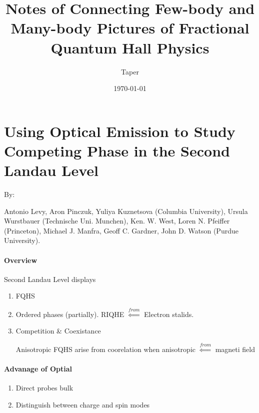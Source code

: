 \documentclass{article}
\title{Notes of Connecting Few-body and Many-body Pictures of Fractional Quantum Hall Physics}
\date{\today}
\author{Taper}
\numberwithin{equation}{subsection} %
\theoremstyle{definition}
\begin{document}
\maketitle
{}
\tableofcontents
\section{Using Optical Emission to Study Competing Phase in the Second
Landau Level}
\label{sec:Using-Optical-Emission-to-Study-Competing-Phase-in-the-Second-Landau-Level}

By: 

Antonio Levy, Aron Pinczuk, Yuliya Kuznetsova (Columbia University),
Ursula Wurstbauer (Technische Uni. Munchen), Ken. W. West, Loren N.
Pfeiffer (Princeton), Michael J. Manfra, Geoff C. Gardner, John D. Watson
(Purdue University).

\paragraph{Overview} Second Landau Level displays
\begin{enumerate}
    \item FQHS
    \item Ordered phases (partially). RIQHE $ \overset{from}{\Leftarrow}$
        Electron stalids.
    \item Competition \& Coexistance

        Anisotropic FQHS arise from coorelation when anisotropic
        $\overset{from}{\Leftarrow}$ magneti field
\end{enumerate}
\paragraph{Advanage of Optial}
\begin{enumerate}
    \item Direct probes bulk
    \item Distinguish between charge and spin modes
\end{enumerate}
\end{document}

